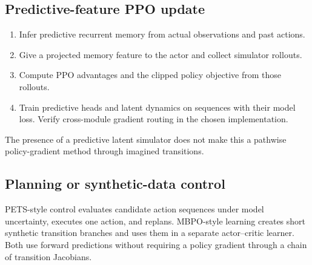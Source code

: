 \subsection{Predictive-feature PPO update}
\begin{enumerate}
\item Infer predictive recurrent memory from actual observations and past actions.
\item Give a projected memory feature to the actor and collect simulator rollouts.
\item Compute PPO advantages and the clipped policy objective from those rollouts.
\item Train predictive heads and latent dynamics on sequences with their model
loss. Verify cross-module gradient routing in the chosen implementation.
\end{enumerate}
The presence of a predictive latent simulator does not make this a pathwise
policy-gradient method through imagined transitions.

\subsection{Planning or synthetic-data control}
PETS-style control evaluates candidate action sequences under model uncertainty,
executes one action, and replans. MBPO-style learning creates short synthetic
transition branches and uses them in a separate actor--critic learner. Both use
forward predictions without requiring a policy gradient through a chain of
transition Jacobians.

